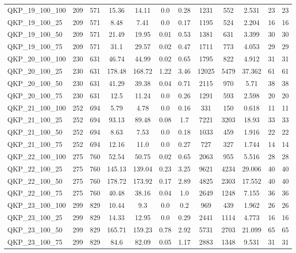 \begin{table}[!h]
{\begin{tabular}{lccccccccccc}
QKP\_19\_100\_100 & 209 & 571 & 15.36 & 14.11 & 0.0 & 0.28 & 1231 & 552 & 2.531 & 23 & 23\\
QKP\_19\_100\_25 & 209 & 571 & 8.48 & 7.41 & 0.0 & 0.17 & 1195 & 524 & 2.204 & 16 & 16\\
QKP\_19\_100\_50 & 209 & 571 & 21.49 & 19.95 & 0.01 & 0.53 & 1381 & 631 & 3.399 & 30 & 30\\
QKP\_19\_100\_75 & 209 & 571 & 31.1 & 29.57 & 0.02 & 0.47 & 1711 & 773 & 4.053 & 29 & 29\\
QKP\_20\_100\_100 & 230 & 631 & 46.74 & 44.99 & 0.02 & 0.65 & 1795 & 822 & 4.912 & 31 & 31\\
QKP\_20\_100\_25 & 230 & 631 & 178.48 & 168.72 & 1.22 & 3.46 & 12025 & 5479 & 37.362 & 61 & 61\\
QKP\_20\_100\_50 & 230 & 631 & 41.29 & 39.38 & 0.04 & 0.71 & 2115 & 970 & 5.71 & 38 & 38\\
QKP\_20\_100\_75 & 230 & 631 & 12.5 & 11.24 & 0.0 & 0.26 & 1291 & 593 & 2.598 & 20 & 20\\
QKP\_21\_100\_100 & 252 & 694 & 5.79 & 4.78 & 0.0 & 0.16 & 331 & 150 & 0.618 & 11 & 11\\
QKP\_21\_100\_25 & 252 & 694 & 93.13 & 89.48 & 0.08 & 1.7 & 7221 & 3203 & 18.93 & 33 & 33\\
QKP\_21\_100\_50 & 252 & 694 & 8.63 & 7.53 & 0.0 & 0.18 & 1033 & 459 & 1.916 & 22 & 22\\
QKP\_21\_100\_75 & 252 & 694 & 12.16 & 11.0 & 0.0 & 0.27 & 727 & 327 & 1.744 & 14 & 14\\
QKP\_22\_100\_100 & 275 & 760 & 52.54 & 50.75 & 0.02 & 0.65 & 2063 & 955 & 5.516 & 28 & 28\\
QKP\_22\_100\_25 & 275 & 760 & 145.13 & 139.04 & 0.23 & 3.25 & 9621 & 4234 & 29.006 & 40 & 40\\
QKP\_22\_100\_50 & 275 & 760 & 178.72 & 173.92 & 0.17 & 2.89 & 4825 & 2303 & 17.552 & 40 & 40\\
QKP\_22\_100\_75 & 275 & 760 & 40.48 & 38.16 & 0.04 & 1.0 & 2649 & 1248 & 7.155 & 36 & 36\\
QKP\_23\_100\_100 & 299 & 829 & 10.44 & 9.3 & 0.0 & 0.2 & 969 & 439 & 1.962 & 26 & 26\\
QKP\_23\_100\_25 & 299 & 829 & 14.33 & 12.95 & 0.0 & 0.29 & 2441 & 1114 & 4.773 & 16 & 16\\
QKP\_23\_100\_50 & 299 & 829 & 165.71 & 159.23 & 0.78 & 2.92 & 5731 & 2703 & 21.099 & 65 & 65\\
QKP\_23\_100\_75 & 299 & 829 & 84.6 & 82.09 & 0.05 & 1.17 & 2883 & 1348 & 9.531 & 31 & 31\\

\end{tabular}}
\end{table}
